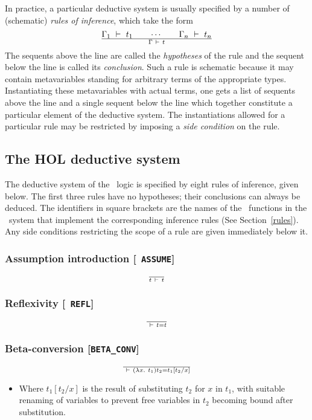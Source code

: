 In practice, a particular deductive system is usually specified by a
number of (schematic) \emph{rules of inference},
which take the form
\[
\Gamma_1\ \vdash\  t_1 \qquad\cdots\qquad\Gamma_n\ \vdash\  t_n
\over
\Gamma \ \vdash\  t
\]
The sequents above the line are called the {\it
hypotheses\/} of the rule and the
sequent below the line is called its {\it
conclusion}. Such a rule is
schematic because it may contain metavariables
standing for arbitrary terms of the appropriate types. Instantiating
these metavariables with actual terms, one gets a list of sequents
above the line and a single sequent below the line which together
constitute a particular element of the deductive system. The
instantiations allowed for a particular rule may be restricted by
imposing a {\em side condition\/} on the rule.


\subsection{The HOL deductive system}
\label{HOLrules}

The deductive system of the \HOL\ logic is specified by eight
rules of inference, given below.  The first three rules
have no hypotheses; their conclusions can always be deduced. The
identifiers in square brackets are the names of the \ML\ functions in
the \HOL\ system that implement the corresponding inference rules (See
Section~\ref{rules}). Any side conditions restricting the scope of a
rule are given immediately below it.

\bigskip

\subsubsection*{Assumption introduction [{\small\tt
ASSUME}]}
\[
\over t
\ \vdash\  t
\]

\subsubsection*{Reflexivity [{\small\tt
REFL}]}
\[
\over
\ \vdash\  t = t
\]

\subsubsection*{Beta-conversion [{\small\tt BETA\_CONV}]}
\[
\over
\ \vdash\  (\lambda x.\ t_1)t_2 = t_1[t_2/x]
\]
\begin{itemize}
\item Where $t_1[t_2/x]$ is
the result of substituting $t_2$ for $x$
in $t_1$, with suitable renaming of variables to prevent free variables
in $t_2$ becoming bound after substitution.
\end{itemize}

